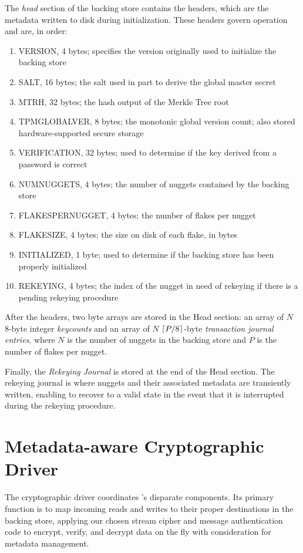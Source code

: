 The \textit{head} section of the backing store contains the headers,
which are the metadata written to disk during \SYSTEM{}
initialization. These headers govern \SYSTEM{} operation and are, in
order:
\begin{enumerate}
\item VERSION, 4 bytes; specifies the \SYSTEM{} version originally
  used to initialize the backing store
\item SALT, 16 bytes; the salt used in part to derive the global
  master secret
\item MTRH, 32 bytes; the hash output of the Merkle Tree root
\item TPMGLOBALVER, 8 bytes; the monotonic global version count; also
  stored hardware-supported secure storage
\item VERIFICATION, 32 bytes; used to determine if the key derived
  from a password is correct
\item NUMNUGGETS, 4 bytes; the number of nuggets contained by the
  backing store
\item FLAKESPERNUGGET, 4 bytes; the number of flakes per nugget
\item FLAKESIZE, 4 bytes; the size on disk of each flake, in bytes
\item INITIALIZED, 1 byte; used to determine if the backing store has
  been properly initialized
\item REKEYING, 4 bytes; the index of the nugget in need of rekeying
  if there is a pending rekeying procedure
\end{enumerate}

After the headers, two byte arrays are stored in the Head section: an
array of $N$ 8-byte integer \textit{keycounts} and an array of $N$
$\lceil P / 8 \rceil$-byte \textit{transaction journal entries}, where $N$ is
the number of nuggets in the backing store and $P$ is the number of
flakes per nugget.

Finally, the \emph{Rekeying Journal} is stored at the end of the Head
section.  The rekeying journal is where nuggets and their associated
metadata are transiently written, enabling \SYSTEM{} to recover to a
valid state in the event that it is interrupted during the rekeying
procedure.

\section{Metadata-aware Cryptographic Driver}

The cryptographic driver coordinates \SYSTEM{}'s disparate components.
Its primary function is to map incoming reads and writes to their
proper destinations in the backing store, applying our chosen stream
cipher and message authentication code to encrypt, verify, and decrypt
data on the fly with consideration for metadata management.

